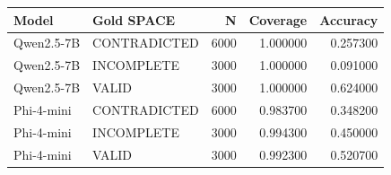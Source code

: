 \begin{tabular}{llrrr}
\toprule
Model & Gold SPACE & N & Coverage & Accuracy \\
\midrule
Qwen2.5-7B & CONTRADICTED & 6000 & 1.000000 & 0.257300 \\
Qwen2.5-7B & INCOMPLETE & 3000 & 1.000000 & 0.091000 \\
Qwen2.5-7B & VALID & 3000 & 1.000000 & 0.624000 \\
Phi-4-mini & CONTRADICTED & 6000 & 0.983700 & 0.348200 \\
Phi-4-mini & INCOMPLETE & 3000 & 0.994300 & 0.450000 \\
Phi-4-mini & VALID & 3000 & 0.992300 & 0.520700 \\
\bottomrule
\end{tabular}
